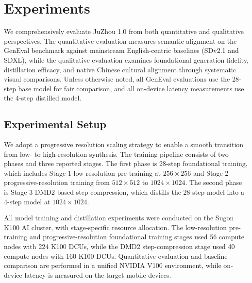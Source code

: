 \section{Experiments}
\label{sec:experiments}

We comprehensively evaluate JuZhou 1.0 from both quantitative and qualitative perspectives. The quantitative evaluation measures semantic alignment on the GenEval benchmark against mainstream English-centric baselines (SDv2.1 and SDXL), while the qualitative evaluation examines foundational generation fidelity, distillation efficacy, and native Chinese cultural alignment through systematic visual comparisons. Unless otherwise noted, all GenEval evaluations use the 28-step base model for fair comparison, and all on-device latency measurements use the 4-step distilled model.

\subsection{Experimental Setup}
\label{sec:experimentalSetup}
We adopt a progressive resolution scaling strategy to enable a smooth transition from low- to high-resolution synthesis. 
The training pipeline consists of two phases and three reported stages. The first phase is 28-step foundational training, which includes Stage 1 low-resolution pre-training at $256\times256$ and Stage 2 progressive-resolution training from $512\times512$ to $1024\times1024$. The second phase is Stage 3 DMD2-based step compression, which distills the 28-step model into a 4-step model at $1024\times1024$.

All model training and distillation experiments were conducted on the Sugon K100 AI cluster, with stage-specific resource allocation. The low-resolution pre-training and progressive-resolution foundational training stages used 56 compute nodes with 224 K100 DCUs, while the DMD2 step-compression stage used 40 compute nodes with 160 K100 DCUs.
Quantitative evaluation and baseline comparison are performed in a unified NVIDIA V100 environment, while on-device latency is measured on the target mobile devices.

